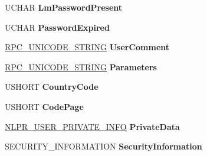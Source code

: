 \begin{DoxyCompactItemize}
U\+C\+H\+AR {\bfseries Lm\+Password\+Present}
\item 
\mbox{\label{struct___n_e_t_l_o_g_o_n___d_e_l_t_a___u_s_e_r_a1d510c2d77cf0afafc35769670d04a75}} 
U\+C\+H\+AR {\bfseries Password\+Expired}
\item 
\mbox{\label{struct___n_e_t_l_o_g_o_n___d_e_l_t_a___u_s_e_r_a02f63f5104e8e5629b43408749f6800a}} 
\hyperlink{struct___r_p_c___u_n_i_c_o_d_e___s_t_r_i_n_g}{R\+P\+C\+\_\+\+U\+N\+I\+C\+O\+D\+E\+\_\+\+S\+T\+R\+I\+NG} {\bfseries User\+Comment}
\item 
\mbox{\label{struct___n_e_t_l_o_g_o_n___d_e_l_t_a___u_s_e_r_a7f6ba93fb901eab06aa363f1c31f1074}} 
\hyperlink{struct___r_p_c___u_n_i_c_o_d_e___s_t_r_i_n_g}{R\+P\+C\+\_\+\+U\+N\+I\+C\+O\+D\+E\+\_\+\+S\+T\+R\+I\+NG} {\bfseries Parameters}
\item 
\mbox{\label{struct___n_e_t_l_o_g_o_n___d_e_l_t_a___u_s_e_r_a4f663153e795d0e6cdab10298a7fc6cb}} 
U\+S\+H\+O\+RT {\bfseries Country\+Code}
\item 
\mbox{\label{struct___n_e_t_l_o_g_o_n___d_e_l_t_a___u_s_e_r_a5c49dc6b5ce05b2699841a62c406bd1d}} 
U\+S\+H\+O\+RT {\bfseries Code\+Page}
\item 
\mbox{\label{struct___n_e_t_l_o_g_o_n___d_e_l_t_a___u_s_e_r_a6aedaadf30e163afd92d28b5dc3f81e8}} 
\hyperlink{struct___n_l_p_r___u_s_e_r___p_r_i_v_a_t_e___i_n_f_o}{N\+L\+P\+R\+\_\+\+U\+S\+E\+R\+\_\+\+P\+R\+I\+V\+A\+T\+E\+\_\+\+I\+N\+FO} {\bfseries Private\+Data}
\item 
\mbox{\label{struct___n_e_t_l_o_g_o_n___d_e_l_t_a___u_s_e_r_a7af50a82e6d9dd8fee7057cb4d9a0d0e}} 
S\+E\+C\+U\+R\+I\+T\+Y\+\_\+\+I\+N\+F\+O\+R\+M\+A\+T\+I\+ON {\bfseries Security\+Information}
\item 
\mbox{\label{struct___n_e_t_l_o_g_o_n___d_e_l_t_a___u_s_e_r_a7f66b7fb73f3b805dd1208657bac46e4}} 

\end{DoxyCompactItemize}
